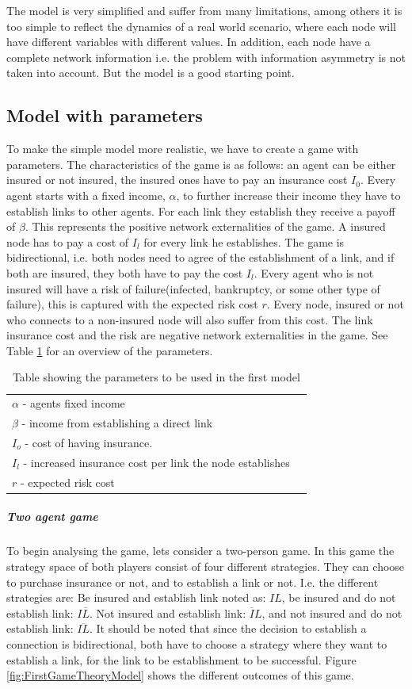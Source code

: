 The model is very simplified and suffer from many limitations, among others it is too simple to reflect the dynamics of a real world scenario, where each node will have different variables with different values. In addition, each node have a complete network information i.e. the problem with information asymmetry is not taken into account. But the model is a good starting point. 

\subsection{Model with parameters}
To make the simple model more realistic, we have to create a game with parameters. The characteristics of the game is as follows: an agent can be either insured or not insured, the insured ones have to pay an insurance cost $I_{0}$. Every agent starts with a fixed income, $\alpha$, to further increase their income they have to establish links to other agents. For each link they establish they receive a payoff of $\beta$. This represents the positive network externalities of the game. A insured node has to pay a cost of $I_{l}$ for every link he establishes. The game is bidirectional, i.e. both nodes need to agree of the establishment of a link, and if both are insured, they both have to pay the cost $I_{l}$. 
Every agent who is not insured will have a risk of failure(infected, bankruptcy, or some other type of failure), this is captured with the expected risk cost $r$. Every node, insured or not who connects to a non-insured node will also suffer from this cost. The link insurance cost and the risk are negative network externalities in the game. See Table \ref{tbl:simplegamepara} for an overview of the parameters. 
\begin{table}[h]
\centering
\begin{tabular}{lc}
 \hline
  $\alpha$ - agents fixed income\\
  $\beta$ - income from establishing a direct link \\
  $I_{o}$ - cost of having insurance. \\
  $I_{l}$ - increased insurance cost per link the node establishes\\
  $r$ - expected risk cost\\
  \hline
\end{tabular}
\caption{Table showing the parameters to be used in the first model \label{tbl:simplegamepara}}
\end{table}
\subparagraph{Two agent game}
To begin analysing the game, lets consider a two-person game. In this game the strategy space of both players consist of four different strategies. They can choose to purchase insurance or not, and to establish a link or not. I.e. the different strategies are: Be insured and establish link noted as: $IL$, 
be insured and do not establish link: $I\overline{L}$. Not insured and establish link: $\overline{I}L$, and not insured and do not establish link: $\overline{IL}$. It should be noted that since the decision to establish a connection is bidirectional, both have to choose a strategy where they want to establish a link, for the link to be establishment to be successful.
Figure \ref{fig:FirstGameTheoryModel} shows the different outcomes of this game.

